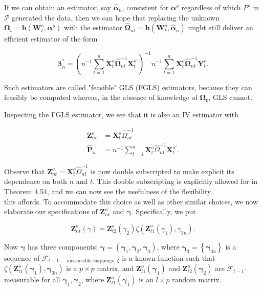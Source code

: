 \documentclass[10pt]{article}
\begin{document}
If we can obtain an estimator, say $\hat{\boldsymbol{\alpha}}_{n}$, consistent for $\boldsymbol{\alpha}^{o}$ regardless of which $P^{o}$ in $\mathcal{P}$ generated the data, then we can hope that replacing the unknown $\boldsymbol{\Omega}_{t}=\mathbf{h}\left(\mathbf{W}_{t}^{o}, \boldsymbol{\alpha}^{o}\right)$ with the estimator $\hat{\boldsymbol{\Omega}}_{n t}=\mathbf{h}\left(\mathbf{W}_{t}^{o}, \hat{\boldsymbol{\alpha}}_{n}\right)$ might still deliver an efficient estimator of the form

$$
\boldsymbol{\beta}_{n}^{*}=\left(n^{-1} \sum_{t=1}^{n} \mathbf{X}_{t}^{o} \hat{\mathbf{\Omega}}_{n t}^{-1} \mathbf{X}_{t}^{o \prime}\right)^{-1} n^{-1} \sum_{t=1}^{n} \mathbf{X}_{t}^{o} \hat{\mathbf{\Omega}}_{n t}^{-1} \mathbf{Y}_{t}^{o} .
$$

Such estimators are called "feasible" GLS (FGLS) estimators, because they can feasibly be computed whereas, in the absence of knowledge of $\boldsymbol{\Omega}_{\boldsymbol{t}}$, GLS cannot.

Inspecting the FGLS estimator, we see that it is also an IV estimator with

$$
\begin{aligned}
\mathbf{Z}_{n t}^{o} & =\mathbf{X}_{t}^{o} \hat{\Omega}_{n t}^{-1} \\
\hat{\mathbf{P}}_{n} & =n^{-1} \sum_{t=1}^{n} \mathbf{X}_{t}^{o} \hat{\Omega}_{n t}^{-1} \mathbf{X}_{t}^{o \prime} .
\end{aligned}
$$

Observe that $\mathbf{Z}_{n t}^{o}=\mathbf{X}_{t}^{o} \hat{\Omega}_{n t}^{-1}$ is now double subscripted to make explicit its dependence on both $n$ and $t$. This double subscripting is explicitly allowed for in Theorem 4.54, and we can now see the usefulness of the flexibility\\
this affords. To accommodate this choice as well as other similar choices, we now elaborate our specifications of $\mathbf{Z}_{n t}^{o}$ and $\boldsymbol{\gamma}$. Specifically, we put

$$
\mathbf{Z}_{n t}^{o}(\gamma)=\mathbf{Z}_{t 2}^{o}\left(\gamma_{2}\right) \zeta\left(\mathbf{Z}_{t 1}^{o}\left(\gamma_{1}\right), \gamma_{3 n}\right) .
$$

Now $\boldsymbol{\gamma}$ has three components: $\boldsymbol{\gamma}=\left(\boldsymbol{\gamma}_{1}, \boldsymbol{\gamma}_{2}, \boldsymbol{\gamma}_{3}\right)$, where $\boldsymbol{\gamma}_{3}=\left\{\boldsymbol{\gamma}_{3 n}\right\}$ is a sequence of $\mathcal{F}_{t-1-\text { measurable mappings, } \zeta}$ is a known function such that $\zeta\left(\mathbf{Z}_{t 1}^{o}\left(\boldsymbol{\gamma}_{1}\right), \boldsymbol{\gamma}_{3 n}\right)$ is a $p \times p$ matrix, and $\mathbf{Z}_{t 1}^{o}\left(\boldsymbol{\gamma}_{1}\right)$ and $\mathbf{Z}_{t 2}^{o}\left(\boldsymbol{\gamma}_{2}\right)$ are $\mathcal{F}_{t-1^{-}}$ measurable for all $\boldsymbol{\gamma}_{1}, \boldsymbol{\gamma}_{2}$, where $\mathbf{Z}_{t 1}^{o}\left(\boldsymbol{\gamma}_{1}\right)$ is an $l \times p$ random matrix.
\end{document}
